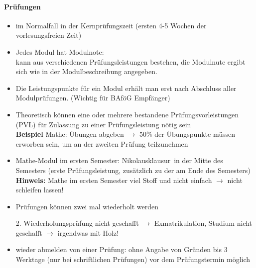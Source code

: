 \documentclass[a4paper,12pt]{report}
\begin{document}
\paragraph{Prüfungen}
\begin{itemize}
	\item im Normalfall in der Kernprüfungszeit (ersten 4-5 Wochen der vorlesungsfreien Zeit)
	\item Jedes Modul hat Modulnote:\\
		kann aus verschiedenen Prüfungsleistungen bestehen, die Modulnute ergibt sich wie in der Modulbeschreibung angegeben.
	\item Die Leistungspunkte für ein Modul erhält man erst nach Abschluss aller Modulprüfungen. (Wichtig für BAföG Empfänger)
	\item Theoretisch können eine oder mehrere bestandene Prüfungsvorleistungen (PVL) für Zulassung zu einer Prüfungsleistung nötig sein\\
		\textbf{Beispiel} Mathe: Übungen abgeben $\rightarrow$ 50\% der Übungspunkte müssen erworben sein, um an der zweiten Prüfung teilzunehmen
	\item Mathe-Modul im ersten Semester: \glqq Nikolausklausur\grqq\ in der Mitte des Semesters (erste Prüfungsleistung, zusätzlich zu der am Ende des Semesters)\\
	\textbf{Hinweis:} Mathe im ersten Semester viel Stoff und nicht einfach $\rightarrow$ nicht schleifen lassen!
	\item Prüfungen können zwei mal wiederholt werden
	2. Wiederholungsprüfung nicht geschafft $\rightarrow$ Exmatrikulation, Studium nicht geschafft $\rightarrow$ irgendwas mit Holz!
	\item wieder abmelden von einer Prüfung: ohne Angabe von Gründen bis 3 Werktage (nur bei schriftlichen Prüfungen) vor dem Prüfungstermin möglich

\end{itemize}
\end{document}
